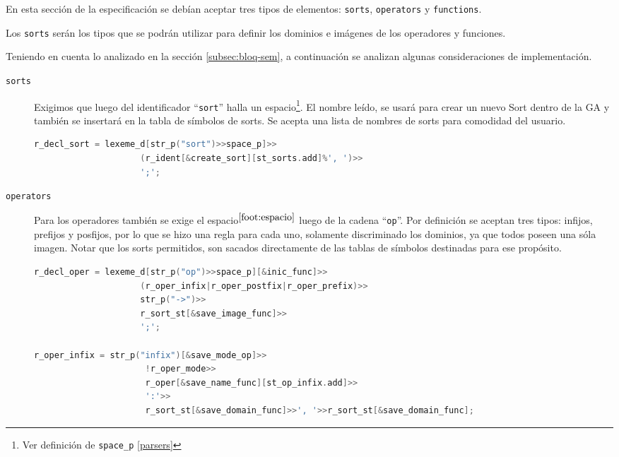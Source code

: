 En esta sección de la especificación se debían aceptar tres tipos de elementos: \texttt{sorts}, \texttt{operators} y \texttt{functions}.

Los \texttt{sorts} serán los tipos que se podrán utilizar para definir los dominios e imágenes de los operadores y funciones.

Teniendo en cuenta lo analizado en la sección \ref{subsec:bloq-sem}, a continuación se analizan algunas consideraciones de implementación.

\begin{description}
\item [\texttt{sorts}] Exigimos que luego del identificador ``\texttt{sort}'' halla un espacio\footnote{\label{foot:espacio} Ver definición de \texttt{space\_p} \ref{parsers}}. El nombre leído, se usará para crear un nuevo Sort dentro de la GA y también se insertará en la tabla de símbolos de sorts. Se acepta una lista de nombres de sorts para comodidad del usuario.

\begin{lstlisting}[language=C++, basicstyle=\scriptsize, columns=fullflexible, linewidth=9cm]
r_decl_sort = lexeme_d[str_p("sort")>>space_p]>>
                     (r_ident[&create_sort][st_sorts.add]%', ')>>
                     ';';
\end{lstlisting}

\item [\texttt{operators}] Para los operadores también se exige el espacio$^{\ref{foot:espacio}}$ luego de la cadena ``\texttt{op}''. Por definición se aceptan tres tipos: infijos, prefijos y posfijos, por lo que se hizo una regla para cada uno, solamente discriminado los dominios, ya que todos poseen una sóla imagen. Notar que los sorts permitidos, son sacados directamente de las tablas de símbolos destinadas para ese propósito.

\begin{lstlisting}[language=C++, basicstyle=\scriptsize, columns=fullflexible, linewidth=13cm]
r_decl_oper = lexeme_d[str_p("op")>>space_p][&inic_func]>>
                     (r_oper_infix|r_oper_postfix|r_oper_prefix)>>
                     str_p("->")>>
                     r_sort_st[&save_image_func]>>
                     ';';

r_oper_infix = str_p("infix")[&save_mode_op]>>
                      !r_oper_mode>>
                      r_oper[&save_name_func][st_op_infix.add]>>
                      ':'>>
                      r_sort_st[&save_domain_func]>>', '>>r_sort_st[&save_domain_func];


\end{lstlisting}
\end{description}
